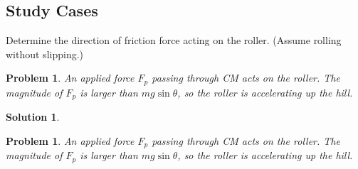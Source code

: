 \documentclass{article}
\newtheorem{problem}[theorem]{Problem}
\newtheorem{solution}[theorem]{Solution}
\begin{document}
\newpage

\subsection{Study Cases}

Determine the direction of friction force acting on the roller. (Assume
rolling without slipping.)

\begin{problem}
An applied force $F_{p}$ passing through CM acts on the roller. The
magnitude of $F_{p}$ is larger than $mg\sin \theta $, so the roller is
accelerating up the hill.\newline

\end{problem}

\begin{solution}
\newline

\end{solution}

\begin{problem}
An applied force $F_{p}$ passing through CM acts on the roller. The
magnitude of $F_{p}$ is larger than $mg\sin \theta $, so the roller is
accelerating up the hill.
\end{problem}
\end{document}
